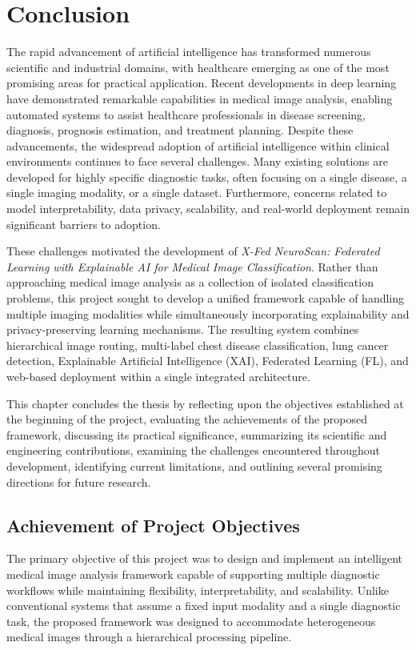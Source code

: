 \chapter{Conclusion}
\label{chap:conclusion}
The rapid advancement of artificial intelligence has transformed numerous scientific and industrial domains, with healthcare emerging as one of the most promising areas for practical application. Recent developments in deep learning have demonstrated remarkable capabilities in medical image analysis, enabling automated systems to assist healthcare professionals in disease screening, diagnosis, prognosis estimation, and treatment planning. Despite these advancements, the widespread adoption of artificial intelligence within clinical environments continues to face several challenges. Many existing solutions are developed for highly specific diagnostic tasks, often focusing on a single disease, a single imaging modality, or a single dataset. Furthermore, concerns related to model interpretability, data privacy, scalability, and real-world deployment remain significant barriers to adoption.

These challenges motivated the development of \textit{X-Fed NeuroScan: Federated Learning with Explainable AI for Medical Image Classification}. Rather than approaching medical image analysis as a collection of isolated classification problems, this project sought to develop a unified framework capable of handling multiple imaging modalities while simultaneously incorporating explainability and privacy-preserving learning mechanisms. The resulting system combines hierarchical image routing, multi-label chest disease classification, lung cancer detection, Explainable Artificial Intelligence (XAI), Federated Learning (FL), and web-based deployment within a single integrated architecture.

This chapter concludes the thesis by reflecting upon the objectives established at the beginning of the project, evaluating the achievements of the proposed framework, discussing its practical significance, summarizing its scientific and engineering contributions, examining the challenges encountered throughout development, identifying current limitations, and outlining several promising directions for future research.

\section{Achievement of Project Objectives}

The primary objective of this project was to design and implement an intelligent medical image analysis framework capable of supporting multiple diagnostic workflows while maintaining flexibility, interpretability, and scalability. Unlike conventional systems that assume a fixed input modality and a single diagnostic task, the proposed framework was designed to accommodate heterogeneous medical images through a hierarchical processing pipeline.

